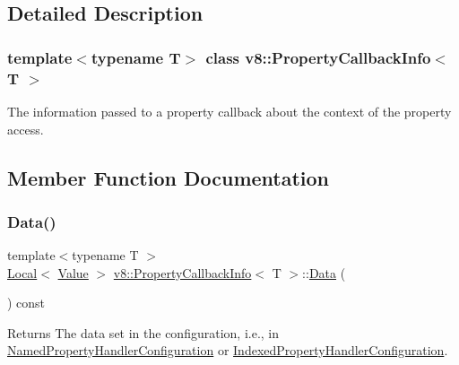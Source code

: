 \subsection{Detailed Description}
\subsubsection*{template$<$typename T$>$\newline
class v8\+::\+Property\+Callback\+Info$<$ T $>$}

The information passed to a property callback about the context of the property access. 

\subsection{Member Function Documentation}
\mbox{\label{classv8_1_1PropertyCallbackInfo_a0156bad4329132beddee04f2d000c617}} 
\subsubsection{\texorpdfstring{Data()}{Data()}}
{\footnotesize\ttfamily template$<$typename T $>$ \\
\mbox{\hyperlink{classv8_1_1Local}{Local}}$<$ \mbox{\hyperlink{classv8_1_1Value}{Value}} $>$ \mbox{\hyperlink{classv8_1_1PropertyCallbackInfo}{v8\+::\+Property\+Callback\+Info}}$<$ T $>$\+::\mbox{\hyperlink{classv8_1_1Data}{Data}} (\begin{DoxyParamCaption}{ }\end{DoxyParamCaption}) const}

\begin{DoxyReturn}{Returns}
The data set in the configuration, i.\+e., in {\ttfamily \mbox{\hyperlink{structv8_1_1NamedPropertyHandlerConfiguration}{Named\+Property\+Handler\+Configuration}}} or {\ttfamily \mbox{\hyperlink{structv8_1_1IndexedPropertyHandlerConfiguration}{Indexed\+Property\+Handler\+Configuration}}.} 
\end{DoxyReturn}
\mbox{\label{classv8_1_1PropertyCallbackInfo_aff7b838ede308ab8a42890962eb9271c}} 
